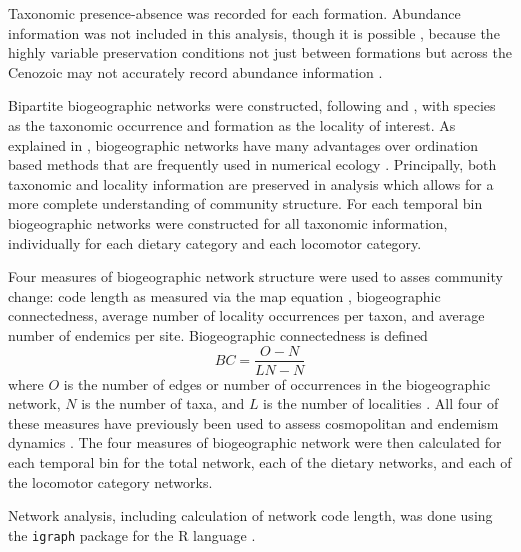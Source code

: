 \documentclass[12pt,letterpaper]{article}
\begin{document}
Taxonomic presence-absence was recorded for each formation. Abundance information was not included in this analysis, though it is possible \citep{Sidor2013}, because the highly variable preservation conditions not just between formations but across the Cenozoic may not accurately record abundance information \citep{Damuth1982}.

%

Bipartite biogeographic networks were constructed, following \citet{Sidor2013} and \citet{Vilhena2013}, with species as the taxonomic occurrence and formation as the locality of interest. As explained in \citet{Sidor2013}, biogeographic networks have many advantages over ordination based methods that are frequently used in numerical ecology \citep{Legendre2012}. Principally, both taxonomic and locality information are preserved in analysis which allows for a more complete understanding of community structure. For each temporal bin biogeographic networks were constructed for all taxonomic information, individually for each dietary category and each locomotor category.

Four measures of biogeographic network structure were used to asses community change: code length as measured via the map equation \citep{Rosvall2007a,Rosvall2008,Rosvall2010b}, biogeographic connectedness, average number of locality occurrences per taxon, and average number of endemics per site. Biogeographic connectedness is defined 
\begin{equation}
  BC = \frac{O - N}{LN - N}
  \label{eq:bc}
\end{equation}
where \(O\) is the number of edges or number of occurrences in the biogeographic network, \(N\) is the number of taxa, and \(L\) is the number of localities \citep{Sidor2013}. All four of these measures have previously been used to assess cosmopolitan and endemism dynamics \citep{Sidor2013}. The four measures of biogeographic network were then calculated for each temporal bin for the total network, each of the dietary networks, and each of the locomotor category networks.

Network analysis, including calculation of network code length, was done using the \texttt{igraph} package \citep{Csardi2006} for the R language \citep{R2013}.
\end{document}
